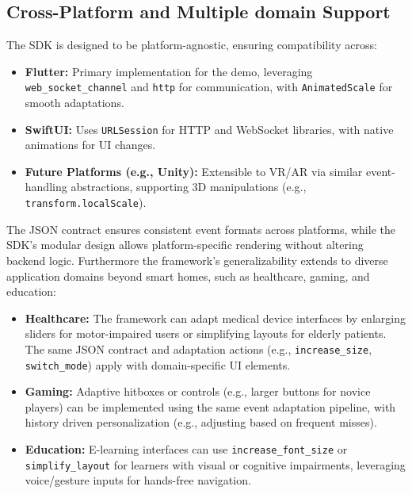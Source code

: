 \documentclass[openany]{book}
\begin{document}
\subsection{Cross-Platform and Multiple domain Support}
The SDK is designed to be platform-agnostic, ensuring compatibility across:
\begin{itemize}
    \item \textbf{Flutter:} Primary implementation for the demo, leveraging \texttt{web\_socket\_channel} and \texttt{http} for communication, with \texttt{AnimatedScale} for smooth adaptations.
    
    \item \textbf{SwiftUI:} Uses \texttt{URLSession} for HTTP and WebSocket libraries, with native animations for UI changes.
    
    \item \textbf{Future Platforms (e.g., Unity):} Extensible to VR/AR via similar event-handling abstractions, supporting 3D manipulations (e.g., \texttt{transform.localScale}).
\end{itemize}
The JSON contract ensures consistent event formats across platforms, while the SDK’s modular design allows platform-specific rendering without altering backend logic.
Furthermore the framework’s generalizability extends to diverse application domains beyond smart homes, such as healthcare, gaming, and education:
\begin{itemize}
    \item \textbf{Healthcare:} The framework can adapt medical device interfaces by enlarging sliders for motor-impaired users or simplifying layouts for elderly patients. The same JSON contract and adaptation actions (e.g., \texttt{increase\_size}, \texttt{switch\_mode}) apply with domain-specific UI elements.
    \item \textbf{Gaming:} Adaptive hitboxes or controls (e.g., larger buttons for novice players) can be implemented using the same event adaptation pipeline, with history driven personalization (e.g., adjusting based on frequent misses).
    \item \textbf{Education:} E-learning interfaces can use \texttt{increase\_font\_size} or \texttt{simplify\_layout} for learners with visual or cognitive impairments, leveraging voice/gesture inputs for hands-free navigation.
\end{itemize}
\end{document}
